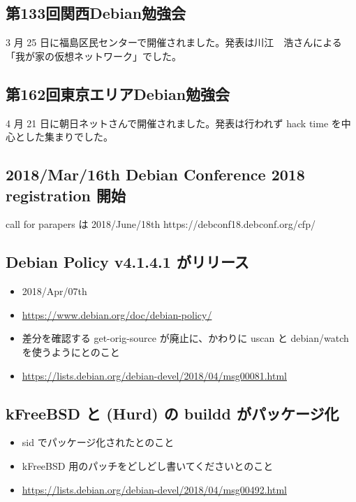 \documentclass[mingoth,a4paper]{jsarticle}
\begin{document}
\subsection{第133回関西Debian勉強会}
3 月 25 日に福島区民センターで開催されました。発表は川江　浩さんによる「我が家の仮想ネットワーク」でした。

\subsection{第162回東京エリアDebian勉強会}
4 月 21 日に朝日ネットさんで開催されました。発表は行われず hack time を中心とした集まりでした。


\subsection{2018/Mar/16th Debian Conference 2018 registration 開始}
			call for parapers は 2018/June/18th https://debconf18.debconf.org/cfp/
\subsection{Debian Policy v4.1.4.1 がリリース}
	\begin{itemize}
		\item 2018/Apr/07th
		\item \url{https://www.debian.org/doc/debian-policy/}
		\item 差分を確認する get-orig-source が廃止に、かわりに uscan と debian/watch を使うようにとのこと
		\item \url{https://lists.debian.org/debian-devel/2018/04/msg00081.html}
	\end{itemize}
\subsection{kFreeBSD と (Hurd) の buildd がパッケージ化}
	\begin{itemize}
		\item sid でパッケージ化されたとのこと
		\item kFreeBSD 用のパッチをどしどし書いてくださいとのこと
		\item \url{https://lists.debian.org/debian-devel/2018/04/msg00492.html}
	\end{itemize}
\end{document}
